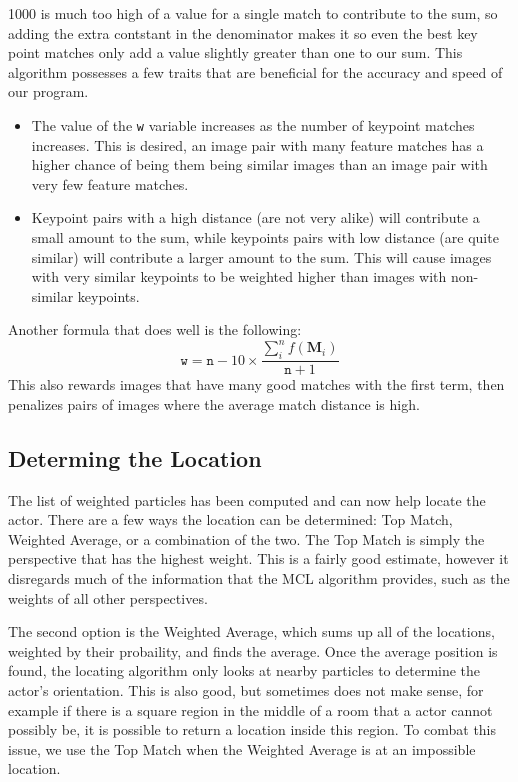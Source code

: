 \documentclass[a4paper,11pt]{article}
\begin{document}
1000 is much too high of a value for a single match to contribute to the sum, so adding the extra contstant in the denominator makes it so even the best key point matches only add a value slightly greater than one to our sum. This algorithm possesses a few traits that are beneficial for the accuracy and speed of our program.
\begin{itemize}
  \item The value of the \texttt{w} variable increases as the number of keypoint matches increases. This is desired, an image pair with many feature matches has a higher chance of being them being similar images than an image pair with very few  feature matches.
  \item Keypoint pairs with a high distance (are not very alike) will contribute a small amount to the sum, while keypoints pairs with low distance (are quite similar) will contribute a larger amount to the sum. This will cause images with very similar keypoints to be weighted higher than images with non-similar keypoints.
\end{itemize}

Another formula that does well is the following:
\[
\mathtt{w} = \mathtt{n} - 10 \times \frac{\sum_{i}^{n} f(\boldsymbol{M}_i)}{\mathtt{n} + 1}
\]
This also rewards images that have many good matches with the first term, then penalizes pairs of images where the average match distance is high.

\subsection{Determing the Location}
The list of weighted particles has been computed and can now help locate the actor. There are a few ways the location can be determined: Top Match, Weighted Average, or a combination of the two. The Top Match is simply the perspective that has the highest weight. This is a fairly good estimate, however it disregards much of the information that the MCL algorithm provides, such as the weights of all other perspectives. 

The second option is the Weighted Average, which sums up all of the locations, weighted by their probaility, and finds the average. Once the average position is found, the locating algorithm only looks at nearby particles to determine the actor's orientation. This is also good, but sometimes does not make sense, for example if there is a square region in the middle of a room that a actor cannot possibly be, it is possible to return a location inside this region. To combat this issue, we use the Top Match when the Weighted Average is at an impossible location.
\end{document}
